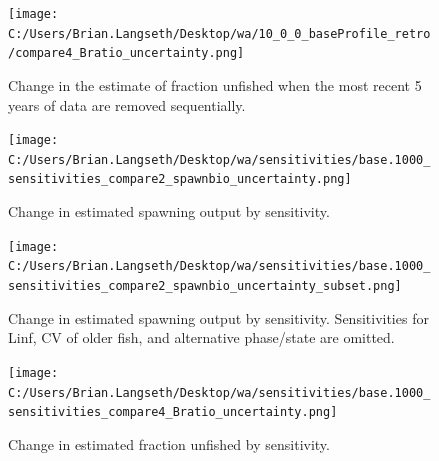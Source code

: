 \documentclass[11pt,
  english,
  letterpaper,
]{article}
\begin{document}

\begin{figure}
\centering
\texttt{[image: C:/Users/Brian.Langseth/Desktop/wa/10\_0\_0\_baseProfile\_retro/compare4\_Bratio\_uncertainty.png]}
\caption{Change in the estimate of fraction unfished when the most recent 5 years of data are removed sequentially.\label{fig:retro-depl}}
\end{figure}

\tagmcend\tagstructend

\newpage


\begin{figure}
\centering
\texttt{[image: C:/Users/Brian.Langseth/Desktop/wa/sensitivities/base.1000\_sensitivities\_compare2\_spawnbio\_uncertainty.png]}
\caption{Change in estimated spawning output by sensitivity.\label{fig:sens-ssb}}
\end{figure}

\tagmcend\tagstructend


\begin{figure}
\centering
\texttt{[image: C:/Users/Brian.Langseth/Desktop/wa/sensitivities/base.1000\_sensitivities\_compare2\_spawnbio\_uncertainty\_subset.png]}
\caption{Change in estimated spawning output by sensitivity. Sensitivities for Linf, CV of older fish, and alternative phase/state are omitted.\label{fig:sens-ssb-subset}}
\end{figure}

\tagmcend\tagstructend


\begin{figure}
\centering
\texttt{[image: C:/Users/Brian.Langseth/Desktop/wa/sensitivities/base.1000\_sensitivities\_compare4\_Bratio\_uncertainty.png]}
\caption{Change in estimated fraction unfished by sensitivity.\label{fig:sens-depl}}
\end{figure}
\end{document}
